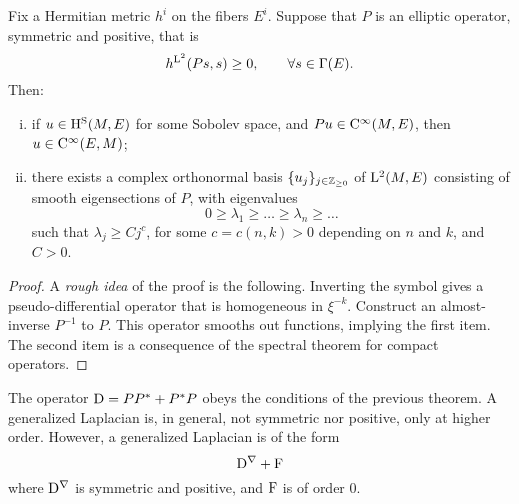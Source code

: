 \begin{theorem}
  Fix a Hermitian metric $h^i$ on the fibers $E^i$.
  Suppose that $P$ is an elliptic operator, symmetric and positive, that is
  \begin{equation*}
    h^{\mathrm{L}^2}(P s, s) \geq 0, \qquad \forall s \in \Gamma(E).
  \end{equation*}
  Then:
  \begin{enumerate}[i)]
    \item if $u \in \mathrm{H}^{\mathrm{S}} (M, E)$ for some Sobolev space, and $P u \in \mathrm{C}^\infty (M, E)$, then $u \in \mathrm{C}^\infty(E, M)$;
    \item there exists a complex orthonormal basis $\{ u_j \}_{j \in \mathbb{Z}_{\geq 0}}$ of $\mathrm{L}^2 (M, E)$ consisting of smooth eigensections of $P$, with eigenvalues
          \begin{equation*}
            0 \geq \lambda_1 \geq \dots \geq \lambda_n \geq \dots
          \end{equation*}
          such that $\lambda_j \geq C j^c$, for some $c = c(n, k) > 0$ depending on $n$ and $k$, and $C > 0$.
  \end{enumerate}
\end{theorem}

\begin{proof}
  A \textit{rough idea} of the proof is the following. Inverting the symbol gives a pseudo-differential operator that is homogeneous in $\xi^{-k}$.
  Construct an almost-inverse $P^{-1}$ to $P$.
  This operator smooths out functions, implying the first item.
  The second item is a consequence of the spectral theorem for compact operators.
\end{proof}

The operator $\mathrm{D} = P P^* + P^* P$ obeys the conditions of the previous theorem.
A generalized Laplacian is, in general, not symmetric nor positive, only at higher order.
However, a generalized Laplacian is of the form
\begin{equation*}
  \mathrm{D}^\nabla + \mathrm{F}
\end{equation*}
where $\mathrm{D}^\nabla$ is symmetric and positive, and $\mathrm{F}$ is of order $0$.
